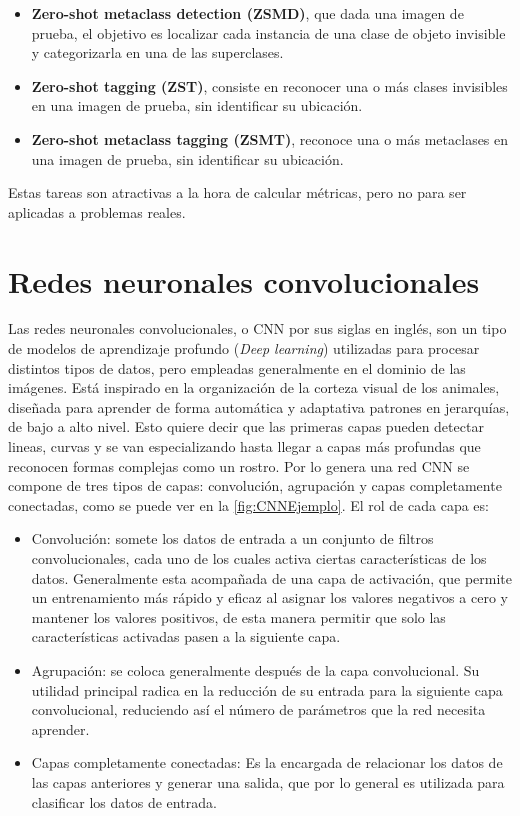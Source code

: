 \begin{itemize}
	
	\item \textbf{Zero-shot metaclass detection (ZSMD)}, que dada una imagen de prueba, el objetivo es localizar cada instancia de una clase de objeto invisible y categorizarla en una de las superclases.
	
	\item \textbf{Zero-shot tagging (ZST)}, consiste en reconocer una o más clases invisibles en una imagen de prueba, sin identificar su ubicación.
	
	\item \textbf{Zero-shot metaclass tagging (ZSMT)}, reconoce una o más metaclases en una imagen de prueba, sin identificar su ubicación.
	
\end{itemize}

Estas tareas son atractivas a la hora de calcular métricas, pero no para ser aplicadas a problemas reales.


\section{Redes neuronales convolucionales} \label{sec:redesneuronalesconvolucionales}
Las redes neuronales convolucionales, o CNN por sus siglas en inglés, son un tipo de modelos de aprendizaje profundo (\textit{Deep learning}) utilizadas  para procesar distintos tipos de datos, pero empleadas generalmente en el dominio de las imágenes. Está inspirado en la organización de la corteza visual de los animales, diseñada para aprender de forma automática y adaptativa patrones en jerarquías, de bajo a alto nivel. Esto quiere decir que las primeras capas pueden detectar lineas, curvas y se van especializando hasta llegar a capas más profundas que reconocen formas complejas como un rostro. Por lo genera una red CNN se compone de tres tipos de capas: convolución, agrupación y capas completamente conectadas, como se puede ver en la \autoref{fig:CNNEjemplo}. El rol de cada capa es:

\begin{itemize}
	\item Convolución: somete los datos de entrada a un conjunto de filtros convolucionales, cada uno de los cuales activa ciertas características de los datos. Generalmente esta acompañada de una capa de activación, que permite un entrenamiento más rápido y eficaz al asignar los valores negativos a cero y mantener los valores positivos, de esta manera permitir que solo las características activadas pasen a la siguiente capa.
	\item Agrupación: se coloca generalmente después de la capa convolucional. Su utilidad principal radica en la reducción de su entrada para la siguiente capa convolucional, reduciendo así el número de parámetros que la red necesita aprender.
	\item Capas completamente conectadas: Es la encargada de relacionar los datos de las capas anteriores y generar una salida, que por lo general es utilizada para clasificar los datos de entrada.
\end{itemize}


